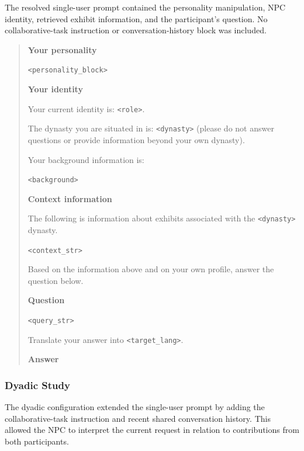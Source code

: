 \documentclass[a4paper,fleqn]{cas-sc}
\begin{document}
The resolved single-user prompt contained the personality manipulation, NPC identity, retrieved exhibit information, and the participant's question.
No collaborative-task instruction or conversation-history block was included.

\begin{quote}
\small

\textbf{Your personality}

\texttt{<personality\_block>}

\medskip
\textbf{Your identity}

Your current identity is: \texttt{<role>}.

The dynasty you are situated in is: \texttt{<dynasty>} 
(please do not answer questions or provide information beyond your own dynasty).

Your background information is:

\texttt{<background>}

\medskip
\textbf{Context information}

The following is information about exhibits associated with the \texttt{<dynasty>} dynasty.

\texttt{<context\_str>}

Based on the information above and on your own profile, answer the question below.

\medskip
\textbf{Question}

\texttt{<query\_str>}

Translate your answer into \texttt{<target\_lang>}.

\medskip
\textbf{Answer}

\end{quote}


\subsubsection{Dyadic Study}

The dyadic configuration extended the single-user prompt by adding the collaborative-task instruction and recent shared conversation history.
This allowed the NPC to interpret the current request in relation to contributions from both participants.
\end{document}
